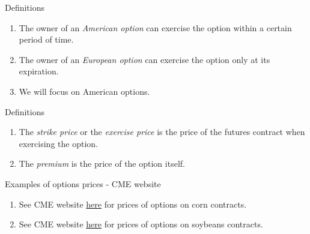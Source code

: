 \documentclass[table,xcolor=pdftex,dvipsnames]{beamer}\usepackage[]{graphicx}\usepackage[]{color}
\begin{document}

\begin{frame}{Definitions}
\begin{enumerate}[label=\textbullet]
  \item The owner of an \emph{American option} can exercise the option within a certain period of time.
  \item The owner of an \emph{European option }can exercise the option only at its expiration.
  \item We will focus on American options.
\end{enumerate}
\end{frame}


\begin{frame}{Definitions}
\begin{enumerate}[label=\textbullet]
  \item The \emph{strike price} or the \emph{exercise price} is the price of the futures contract when exercising the option.
  \item The \emph{premium} is the price of the option itself.
\end{enumerate}
\end{frame}


\begin{frame}{Examples of options prices - CME website}
\begin{enumerate}[label=\textbullet]
  \item See CME website \href{http://www.cmegroup.com/trading/agricultural/grain-and-oilseed/corn_quotes_globex_options.html}{here} for prices of options on corn contracts.
  \item See CME website \href{http://www.cmegroup.com/trading/agricultural/grain-and-oilseed/soybean_quotes_globex_options.html}{here} for prices of options on soybeans contracts.
\end{enumerate}
\end{frame}

\end{document}
